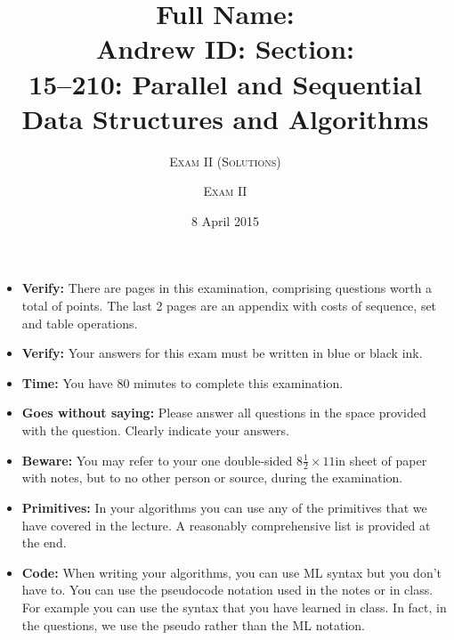 \documentclass[11pt,addpoints]{exam}
\title{
\vspace*{-2cm}
{ \large \bf
  Full Name: \enspace\hrulefill \\
  Andrew ID: \enspace\hrulefill
  \quad
  Section: \enspace\hrulefill 
}\\
\vspace{0.5in}
15--210: Parallel and Sequential Data Structures and Algorithms}
\author{\textsc{Exam II (Solutions)}}
\author{\textsc{Exam II}}
\date{8 April 2015}
\begin{document}
\maketitle{}
\thispagestyle{foot}

\begin{itemize}
\item \textbf{Verify:} There are \numpages{} pages in this
  examination, comprising \numquestions{} questions worth a total of
  \numpoints{} points.  The last 2 pages are an appendix with costs of
  sequence, set and table operations.

\item \textbf{Verify: } Your answers for this exam must be written in blue or black ink.

\item \textbf{Time:} You have 80 minutes to complete this examination.


\item \textbf{Goes without saying:} Please answer all questions in the
  space provided with the question.  Clearly indicate your answers.

\item \textbf{Beware:} You may refer to your one double-sided $8\frac{1}{2} \times 11$in
  sheet of paper with notes, but to no other person or source, during the
  examination.

\item \textbf{Primitives:} In your algorithms you can use any of the
  primitives that we have covered in the lecture.  A reasonably
  comprehensive list is provided at the end.

\item \textbf{Code:} When writing your algorithms, you can use ML
  syntax but you don't have to.  You can use the pseudocode notation
  used in the notes or in class.  For example you can use the syntax
  that you have learned in class.  In fact, in the questions, we use
  the pseudo rather than the ML notation.


\end{itemize}
\end{document}
